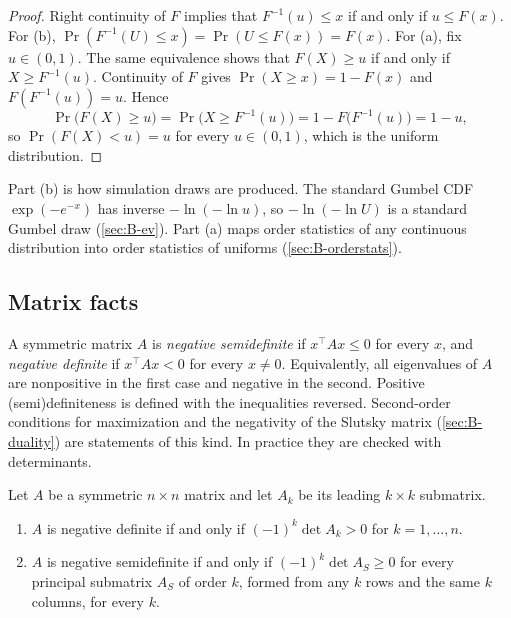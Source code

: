 \begin{proof}
Right continuity of $F$ implies that $F^{-1}(u) \leq x$ if and only if $u \leq F(x)$. For (b),
$\Pr(F^{-1}(U) \leq x) = \Pr(U \leq F(x)) = F(x)$. For (a), fix $u \in (0, 1)$. The same equivalence shows that
$F(X) \geq u$ if and only if $X \geq F^{-1}(u)$. Continuity of $F$ gives $\Pr(X \geq x) = 1 - F(x)$ and
$F(F^{-1}(u)) = u$. Hence
\begin{equation*}
\Pr\big(F(X) \geq u\big) = \Pr\big(X \geq F^{-1}(u)\big) = 1 - F\big(F^{-1}(u)\big) = 1 - u ,
\end{equation*}
so $\Pr(F(X) < u) = u$ for every $u \in (0, 1)$, which is the uniform distribution.
\end{proof}

Part (b) is how simulation draws are produced. The standard Gumbel CDF $\exp(-e^{-x})$ has inverse
$-\ln(-\ln u)$, so $-\ln(-\ln U)$ is a standard Gumbel draw (\cref{sec:B-ev}). Part (a) maps order statistics of any
continuous distribution into order statistics of uniforms (\cref{sec:B-orderstats}).

\subsection{Matrix facts}\label{sec:B-matrix}

A symmetric matrix $A$ is \emph{negative semidefinite} if $x^\top Ax \leq 0$ for every $x$, and \emph{negative definite}
if $x^\top Ax < 0$ for every $x \neq 0$. Equivalently, all eigenvalues of $A$ are nonpositive in the first case and
negative in the second. Positive
(semi)definiteness is defined with the inequalities reversed. Second-order conditions for maximization and the
negativity of the Slutsky matrix (\cref{sec:B-duality}) are statements of this kind. In practice they are checked
with determinants.

\begin{proposition}\label{prop:B-minors}
Let $A$ be a symmetric $n \times n$ matrix and let $A_k$ be its leading $k \times k$ submatrix.
\begin{enumerate}[label=(\alph*)]
  \item $A$ is negative definite if and only if $(-1)^k\det A_k > 0$ for $k = 1, \dots, n$.
  \item $A$ is negative semidefinite if and only if $(-1)^k\det A_S \geq 0$ for every principal submatrix $A_S$ of
  order $k$, formed from any $k$ rows and the same $k$ columns, for every $k$.
\end{enumerate}
\end{proposition}


